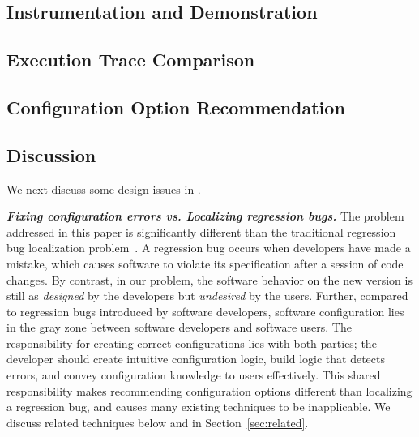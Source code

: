 \subsection{Instrumentation and Demonstration}
\label{sec:profiling}



\subsection{Execution Trace Comparison}
\label{sec:comparison}



\subsection{Configuration Option Recommendation}
\label{sec:rootcause}



\subsection{Discussion}
\label{sec:tech_discuss}

We next discuss some design issues in \ourtool.

\vspace{1mm}

\noindent \textbf{\textit{Fixing configuration errors 
vs. Localizing regression bugs.}}
The problem addressed in this paper is significantly different
than the traditional regression bug localization problem~\cite{dd, autoflow}.
A regression bug occurs when developers have made a mistake,
which causes software to violate its specification after a session of code changes.
By contrast, in our problem, the software behavior on the new version
is still as \textit{designed} by the developers
but \textit{undesired} by the users. 
Further, compared to
regression bugs introduced by software developers,
software configuration lies in the gray zone between
software developers and software users. The responsibility for creating
correct configurations lies with both parties; the developer should create
intuitive configuration logic, build logic that detects
errors, and convey configuration knowledge to users
effectively. This shared responsibility makes recommending configuration options
different than localizing a regression bug, and causes many existing
techniques to be inapplicable. We discuss related techniques below
and in Section~\ref{sec:related}.


